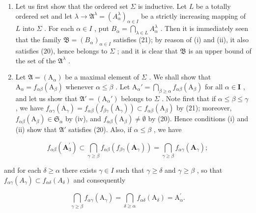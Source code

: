 \begin{enumerate}
\def\labelenumi{(\arabic{enumi})}
\item
  Let us first show that the ordered set \(\Sigma\) is inductive. Let \(L\) be a totally ordered set and let \(\lambda \to \mathfrak{A}^{\lambda} = (A_{\alpha}^{\lambda})_{\alpha \in I}\) be a strictly increasing mapping of \(L\) into \(\Sigma\) . For each \(\alpha \in I\) , put \(B_{\alpha} = \bigcap_{\lambda \in L} A_{\alpha}^{\lambda}\) . Then it is immediately seen that the family \(\mathfrak{B} = (B_{\alpha})_{\alpha \in I}\) satisfies (21); by reason of (i) and (ii), it also satisfies (20), hence belongs to \(\Sigma\) ; and it is clear that \(\mathfrak{B}\) is an upper bound of the set of the \(\mathfrak{A}^{\lambda}\) .
\item
  Let \(\mathfrak{A} = (\mathrm{A}_{\alpha})\) be a maximal element of \(\Sigma\) . We shall show that \(\mathrm{A}_{\alpha} = f_{\alpha \beta}(\mathrm{A}_{\beta})\) whenever \(\alpha \leqslant \beta\) . Let \(\mathrm{A}_{\alpha}' = \bigcap_{\beta \geqslant \alpha} f_{\alpha \beta}(\mathrm{A}_{\beta})\) for all \(\alpha \in \mathbf{I}\) , and let us show that \(\mathfrak{A}' = (\mathrm{A}_{\alpha}')\) belongs to \(\Sigma\) . Note first that if \(\alpha \leqslant \beta \leqslant \gamma\) , we have \(f_{\alpha \gamma}(\mathrm{A}_{\gamma}) = f_{\alpha \beta}(f_{\beta \gamma}(\mathrm{A}_{\gamma})) \subset f_{\alpha \beta}(\mathrm{A}_{\beta})\) by (21); moreover, \(f_{\alpha \beta}(\mathrm{A}_{\beta}) \in \mathfrak{S}_{\alpha}\) by (iv), and \(f_{\alpha \beta}(\mathrm{A}_{\beta}) \neq \emptyset\) by (20). Hence conditions (i) and (ii) show that \(\mathfrak{A}'\) satisfies (20). Also, if \(\alpha \leqslant \beta\) , we have
\end{enumerate}

\[
f _ {\alpha \beta} (\mathbf {A} _ {3} ^ {\prime}) \subset \bigcap_ {\gamma \geqslant \beta} f _ {\alpha \beta} (f _ {\beta \gamma} (\mathbf {A} _ {\gamma})) = \bigcap_ {\gamma \geqslant \beta} f _ {\alpha \gamma} (\mathbf {A} _ {\gamma});
\]

and for each \(\delta \geqslant \alpha\) there exists \(\gamma \in I\) such that \(\gamma \geqslant \delta\) and \(\gamma \geqslant \beta\) , so that \(f_{\alpha \gamma}(A_{\gamma}) \subset f_{\alpha \delta}(A_{\delta})\) and consequently

\[
\bigcap_ {\gamma \geqslant \beta} f _ {\alpha \gamma} (\mathrm{A} _ {\gamma}) = \bigcap_ {\delta \geqslant \alpha} f _ {\alpha \delta} (\mathrm{A} _ {\delta}) = \mathrm{A} _ {\alpha} ^ {\prime}.
\]

